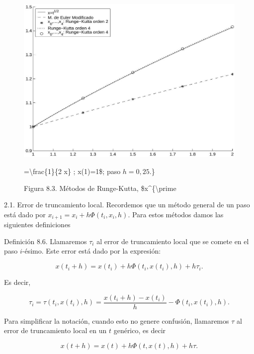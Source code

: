 \documentclass[10pt]{book}
\begin{document}
\begin{figure}[h]
\begin{center}
  \includegraphics[width=\textwidth]{2025_09_05_3888c9ac96bd653d96b4g-182}
\captionsetup{labelformat=empty}
\caption{Figura 8.3. Métodos de Runge-Kutta, \$x\^{}\{\textbackslash prime}=\textbackslash frac\{1\}\{2 x\} ; x(1)=1\$; paso $h=0,25$.\}\end{center}
\end{figure}

2.1. Error de truncamiento local. Recordemos que un método general de un paso está dado por $x_{i+1}=x_{i}+h \Phi\left(t_{i}, x_{i}, h\right)$. Para estos métodos damos las siguientes definiciones

Definición 8.6. Llamaremos $\tau_{i}$ al error de truncamiento local que se comete en el paso $i$-ésimo. Este error está dado por la expresión:


\begin{equation*}
x\left(t_{i}+h\right)=x\left(t_{i}\right)+h \Phi\left(t_{i}, x\left(t_{i}\right), h\right)+h \tau_{i} . \tag{8.16}
\end{equation*}


Es decir,

$$
\tau_{i}=\tau\left(t_{i}, x\left(t_{i}\right), h\right)=\frac{x\left(t_{i}+h\right)-x\left(t_{i}\right)}{h}-\Phi\left(t_{i}, x\left(t_{i}\right), h\right) .
$$

Para simplificar la notación, cuando esto no genere confusión, llamaremos $\tau$ al error de truncamiento local en un $t$ genérico, es decir

$$
x(t+h)=x(t)+h \Phi(t, x(t), h)+h \tau .
$$
\end{document}
